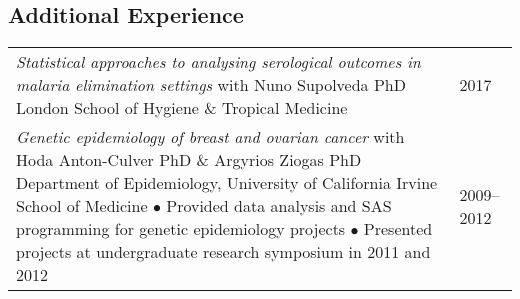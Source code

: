\documentclass[letterpaper]{article}
\newcommand{\newlineb}                 %
    {
      \newline 
      \small                           %
      \hspace{0.30cm}                  %
      $\bullet$                        %
      }
\begin{document}
\subsection*{Additional Experience}
\begin{tabular}{L{14.5 cm}R{2.0 cm}}

\textit{Statistical approaches to analysing serological outcomes in malaria elimination settings}
  \newline  with Nuno Supolveda PhD 
  \newline  London School of Hygiene \& Tropical Medicine
& 2017 \\



\textit{Genetic epidemiology of breast and ovarian cancer}
  \newline with Hoda Anton-Culver PhD \& Argyrios Ziogas PhD
  \newline Department of Epidemiology, University of California Irvine School of Medicine
  {\newlineb Provided data analysis and SAS programming for genetic epidemiology projects }
  {\newlineb Presented projects at undergraduate research symposium in 2011 and 2012}
& 2009--2012 

\end{tabular}

\end{document}
